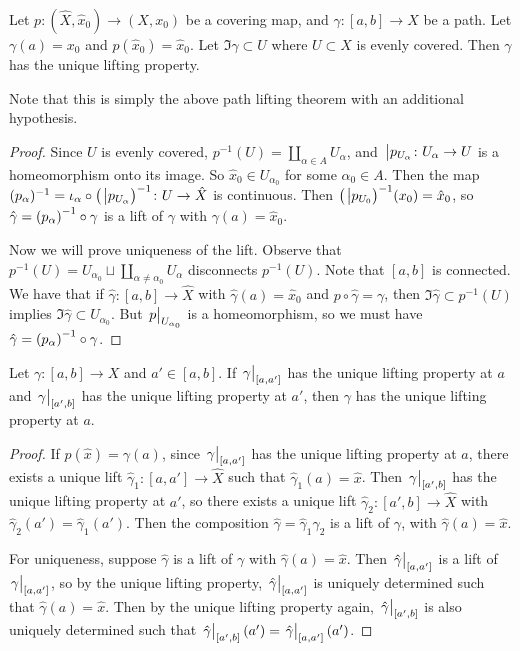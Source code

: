 \begin{lemma}
	Let \( p \colon (\hat X, \hat x_0) \to (X, x_0) \) be a covering map, and \( \gamma \colon [a,b] \to X \) be a path.
	Let \( \gamma(a) = x_0 \) and \( p(\hat x_0) = \hat x_0 \).
	Let \( \Im \gamma \subset U \) where \( U \subset X \) is evenly covered.
	Then \( \gamma \) has the unique lifting property.
\end{lemma}
Note that this is simply the above path lifting theorem with an additional hypothesis.
\begin{proof}
	Since \( U \) is evenly covered, \( p^{-1}(U) = \coprod_{\alpha \in A} U_\alpha \), and \( \eval p_{U_\alpha} \colon U_\alpha \to U \) is a homeomorphism onto its image.
	So \( \hat x_0 \in U_{\alpha_0} \) for some \( \alpha_0 \in A \).
	Then the map \( (p_\alpha)^{-1} = \iota_\alpha \circ \qty(\eval p_{U_\alpha})^{-1} \colon U \to \hat X \) is continuous.
	Then \( \qty(\eval p_{U_0})^{-1}(x_0) = \hat x_0 \), so \( \hat \gamma = \qty(p_\alpha)^{-1} \circ \gamma \) is a lift of \( \gamma \) with \( \gamma(a) = \hat x_0 \).

	Now we will prove uniqueness of the lift.
	Observe that \( p^{-1}(U) = U_{\alpha_0} \sqcup \coprod_{\alpha \neq \alpha_0} U_\alpha \) disconnects \( p^{-1}(U) \).
	Note that \( [a,b] \) is connected.
	We have that if \( \hat\gamma \colon[a,b] \to \hat X \) with \( \hat \gamma(a) = \hat x_0 \) and \( p \circ \hat\gamma = \gamma \), then \( \Im \hat\gamma \subset p^{-1}(U) \) implies \( \Im \hat\gamma \subset U_{\alpha_0} \).
	But \( \eval{p}_{U_{\alpha_0}} \) is a homeomorphism, so we must have \( \hat \gamma = \qty(p_\alpha)^{-1} \circ \gamma \).
\end{proof}
\begin{lemma}
	Let \( \gamma \colon [a,b] \to X \) and \( a' \in [a,b] \).
	If \( \eval{\gamma}_{[a,a']} \) has the unique lifting property at \( a \) and \( \eval{\gamma}_{[a',b]} \) has the unique lifting property at \( a' \), then \( \gamma \) has the unique lifting property at \( a \).
\end{lemma}
\begin{proof}
	If \( p(\hat x) = \gamma(a) \), since \( \eval{\gamma}_{[a,a']} \) has the unique lifting property at \( a \), there exists a unique lift \( \hat\gamma_1 : [a,a'] \to \hat X \) such that \( \hat\gamma_1(a) = \hat x \).
	Then \( \eval{\gamma}_{[a',b]} \) has the unique lifting property at \( a' \), so there exists a unique lift \( \hat\gamma_2 \colon [a',b] \to \hat X \) with \( \hat\gamma_2(a') = \hat\gamma_1(a') \).
	Then the composition \( \hat\gamma=\hat\gamma_1\hat\gamma_2 \) is a lift of \( \gamma \), with \( \hat\gamma(a) = \hat x \).

	For uniqueness, suppose \( \hat\gamma \) is a lift of \( \gamma \) with \( \hat\gamma(a) = \hat x \).
	Then \( \eval{\hat\gamma}_{[a,a']} \) is a lift of \( \eval{\gamma}_{[a,a']} \), so by the unique lifting property, \( \eval{\hat\gamma}_{[a,a']} \) is uniquely determined such that \( \hat\gamma(a) = \hat x \).
	Then by the unique lifting property again, \( \eval{\hat\gamma}_{[a',b]} \) is also uniquely determined such that \( \eval{\hat\gamma}_{[a',b]}(a') = \eval{\hat\gamma}_{[a,a']}(a') \).
\end{proof}
